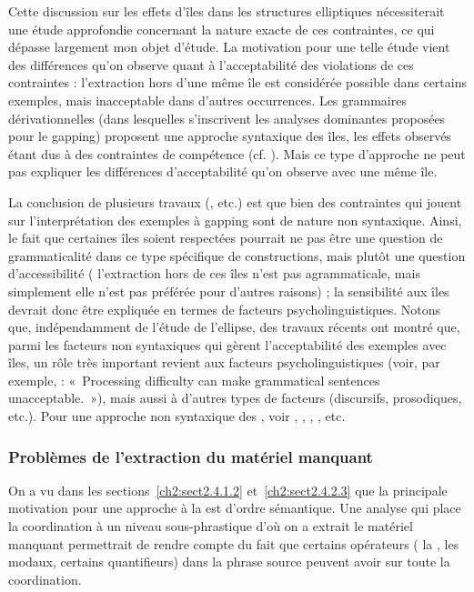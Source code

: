 Cette discussion sur les effets d’îles dans les structures elliptiques nécessiterait une étude approfondie concernant la nature exacte de ces contraintes, ce qui dépasse largement mon objet d’étude. La motivation pour une telle étude vient des différences qu’on observe quant à l’acceptabilité des violations de ces contraintes : l’extraction hors d’une même île est considérée possible dans certains exemples, mais inacceptable dans d’autres occurrences. Les grammaires dérivationnelles (dans lesquelles s’inscrivent les analyses dominantes proposées pour le gapping) proposent une approche syntaxique des îles, les effets observés étant dus à des contraintes de compétence (cf. \citealt{Ross1967}). Mais ce type d’approche ne peut pas expliquer les différences d’acceptabilité qu’on observe avec une même île. 

La conclusion de plusieurs travaux (\citealt{Hankamer1973,Kuno1976,Sag1976,SagEtAl1985,Gardent1991}, etc.) est que bien des contraintes qui jouent sur l’interprétation des exemples à gapping sont de nature non syntaxique. Ainsi, le fait que certaines îles soient respectées pourrait ne pas être une question de grammaticalité dans ce type spécifique de constructions, mais plutôt une question d’accessibilité ({\cad} l’extraction hors de ces îles n’est pas agrammaticale, mais simplement elle n’est pas préférée pour d’autres raisons) ; la sensibilité aux îles devrait donc être expliquée en termes de facteurs psycholinguistiques. Notons que, indépendamment de l’étude de l’ellipse, des travaux récents ont montré que, parmi les facteurs non syntaxiques qui gèrent l’acceptabilité des exemples avec îles, un rôle très important revient aux facteurs psycholinguistiques (voir, par exemple, \citealt{FanselowEtAl2006} : «~Processing difficulty can make grammatical sentences unacceptable.~»), mais aussi à d’autres types de facteurs (discursifs, prosodiques, etc.). Pour une approche non syntaxique des , voir \citet{Kluender1998}, \citet{FanselowEtAl2006}, \citet{AmbridgeEtAl2008}, \citet{HofmeisterEtAl2010}, etc.      


\subsubsection{Problèmes de l’extraction du matériel manquant} \label{ch2:sect2.4.3.2}

On a vu dans les sections~\ref{ch2:sect2.4.1.2} et~\ref{ch2:sect2.4.2.3} que la principale motivation pour une approche à la \citet{Johnson1996/2004,Johnson2000,Johnson2009} est d’ordre sémantique. Une analyse qui place la coordination à un niveau sous-phrastique d’où on a extrait le matériel manquant permettrait de rendre compte du fait que certains opérateurs ({\cad} la , les modaux, certains quantifieurs) dans la phrase source peuvent avoir  sur toute la coordination. 

